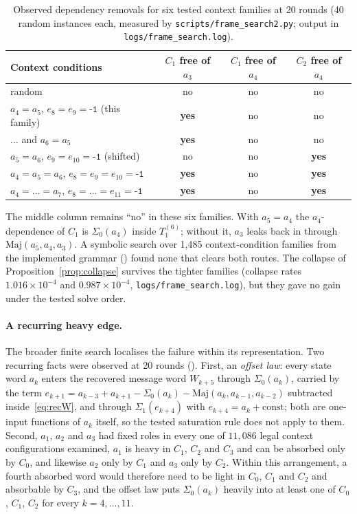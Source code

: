 \documentclass[11pt,a4paper]{article}
\newcommand{\Sig}[1]{\Sigma_{#1}}
\newcommand{\Maj}{\mathrm{Maj}}
\newcommand{\hex}[1]{\texttt{#1}}
\begin{document}
\begin{table}[t]
\centering\small
\caption{Observed dependency removals for six tested context families at 20
rounds (40 random instances each, measured by
\texttt{scripts/frame\_search2.py}; output in \texttt{logs/frame\_search.log}).}
\label{tab:frames}
\begin{tabular}{@{}lccc@{}}
\toprule
Context conditions & $C_1$ free of $a_3$ & $C_1$ free of $a_4$ & $C_2$ free of $a_4$ \\
\midrule
random & no & no & no \\
$a_4=a_5$, $e_8=e_9=\hex{-1}$ (this family) & \textbf{yes} & no & no \\
$\ldots$ and $a_6=a_5$ & \textbf{yes} & no & no \\
$a_5=a_6$, $e_9=e_{10}=\hex{-1}$ (shifted) & no & no & \textbf{yes} \\
$a_4=a_5=a_6$, $e_8=e_9=e_{10}=\hex{-1}$ & \textbf{yes} & no & \textbf{yes} \\
$a_4=\dots=a_7$, $e_8=\dots=e_{11}=\hex{-1}$ & \textbf{yes} & no & \textbf{yes} \\
\bottomrule
\end{tabular}
\end{table}

The middle column remains ``no'' in these six families.  With $a_5=a_4$ the $a_4$-dependence of $C_1$
is $\Sig0(a_4)$ inside $T_1^{(6)}$; without it, $a_3$ leaks back in through
$\Maj(a_5,a_4,a_3)$.  A symbolic search over 1{,}485 context-condition families
from the implemented grammar () found none
that clears both routes.  The collapse of Proposition~\ref{prop:collapse} survives the
tighter families (collapse rates $1.016\times10^{-4}$ and
$0.987\times10^{-4}$, \texttt{logs/frame\_search.log}), but they gave no gain
under the tested solve order.

\paragraph{A recurring heavy edge.}
The broader finite search localises the failure within its representation.
Two recurring facts were observed at 20 rounds
().  First, an
\emph{offset law}: every state word $a_k$ enters the recovered message word
$W_{k+5}$ through $\Sig0(a_k)$, carried by the term
$e_{k+1}=a_{k-3}+a_{k+1}-\Sig0(a_k)-\Maj(a_k,a_{k-1},a_{k-2})$ subtracted
inside~\eqref{eq:recW}, and through $\Sig1(e_{k+4})$ with $e_{k+4}=a_k+\text{const}$;
both are one-input functions of $a_k$ itself, so the tested saturation rule
does not apply to them.  Second, $a_1$, $a_2$ and $a_3$ had fixed roles in
every one of
$11{,}086$ legal context configurations examined, $a_1$ is heavy in $C_1$, $C_2$
and $C_3$ and can be absorbed only by $C_0$, and likewise $a_2$ only by $C_1$
and $a_3$ only by $C_2$.  Within this arrangement, a fourth absorbed word
would therefore need to be light in
$C_0$, $C_1$ and $C_2$ and absorbable by $C_3$, and the offset law puts
$\Sig0(a_k)$ heavily into at least one of $C_0$, $C_1$, $C_2$ for every
$k=4,\dots,11$.
\end{document}
